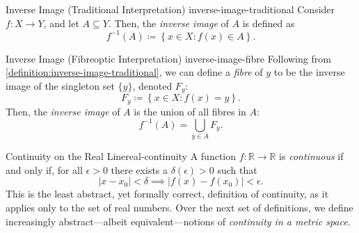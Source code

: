 \documentclass{article}
\newif\ifdraft
\numberwithin{equation}{section}
\numberwithin{figure}{section}
\begin{document}
\begin{definition}{Inverse Image (Traditional Interpretation)}
        {inverse-image-traditional}
    Consider $ f \colon X \to Y $, and let $ A \subseteq Y $. Then, the
    \emph{inverse image} of $ A $ is defined as
    \begin{equation}
        f^{-1}{(A)} \coloneq \left\{ x \in X \colon f(x) \in A \right\}.
    \end{equation}
\end{definition}
\begin{definition}{Inverse Image (Fibreoptic Interpretation)}
        {inverse-image-fibre}
    Following from \cref{definition:inverse-image-traditional}, we can define a
    \emph{fibre} of $ y $ to be the inverse image of the singleton set $ \{ y \}
    $, denoted $ F_y $:
    \begin{equation}
        F_y \coloneq \left\{ x \in X \colon f(x) = y \right\}.
    \end{equation}
    Then, the \emph{inverse image} of $ A $ is the union of all fibres in $ A $:
    \begin{equation}
        f^{-1}{(A)} = \bigcup_{y \in A} F_y.
    \end{equation}
\end{definition}
\begin{definition}{Continuity on the Real Line}{real-continuity}
    A function $ f \colon \mathbb{R} \to \mathbb{R} $ is \emph{continuous} if
    and only if, for all $ \epsilon > 0 $ there exists a $ \delta{(\epsilon)} >
    0 $ such that
    \begin{equation}
        \left\vert x - x_0 \right\vert < \delta \implies \left\vert f{(x)} -
        f{\left(x_0\right)} \right\vert < \epsilon.
    \end{equation}
    This is the least abstract, yet formally correct, definition of continuity,
    as it applies only to the set of real numbers. Over the next set of
    definitions, we define increasingly abstract---albeit equivalent---notions
    of \emph{continuity in a metric space}.
\end{definition}

\clearpage
\ifdraft\else
\fi
\printbibliography[heading=bibintoc,
    title={Recommended Texts \& Further Reading}]
\end{document}
